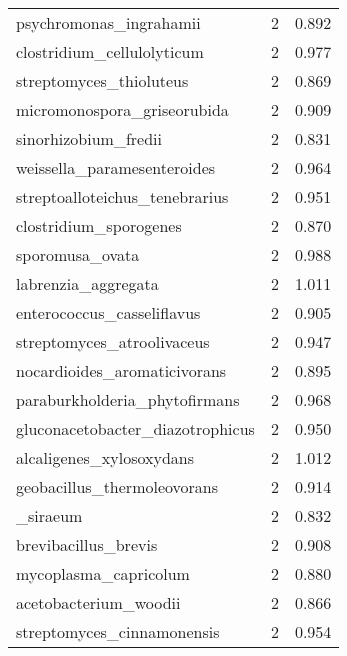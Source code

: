 \begin{tabular}{lrr}
                     psychromonas\_ingrahamii &                   2 &     0.892 \\
                  clostridium\_cellulolyticum &                   2 &     0.977 \\
                     streptomyces\_thioluteus &                   2 &     0.869 \\
                 micromonospora\_griseorubida &                   2 &     0.909 \\
                        sinorhizobium\_fredii &                   2 &     0.831 \\
                 weissella\_paramesenteroides &                   2 &     0.964 \\
              streptoalloteichus\_tenebrarius &                   2 &     0.951 \\
                      clostridium\_sporogenes &                   2 &     0.870 \\
                             sporomusa\_ovata &                   2 &     0.988 \\
                         labrenzia\_aggregata &                   2 &     1.011 \\
                  enterococcus\_casseliflavus &                   2 &     0.905 \\
                  streptomyces\_atroolivaceus &                   2 &     0.947 \\
                nocardioides\_aromaticivorans &                   2 &     0.895 \\
               paraburkholderia\_phytofirmans &                   2 &     0.968 \\
            gluconacetobacter\_diazotrophicus &                   2 &     0.950 \\
                    alcaligenes\_xylosoxydans &                   2 &     1.012 \\
                 geobacillus\_thermoleovorans &                   2 &     0.914 \\
                       [eubacterium]\_siraeum &                   2 &     0.832 \\
                        brevibacillus\_brevis &                   2 &     0.908 \\
                       mycoplasma\_capricolum &                   2 &     0.880 \\
                       acetobacterium\_woodii &                   2 &     0.866 \\
                  streptomyces\_cinnamonensis &                   2 &     0.954 \\

\end{tabular}
